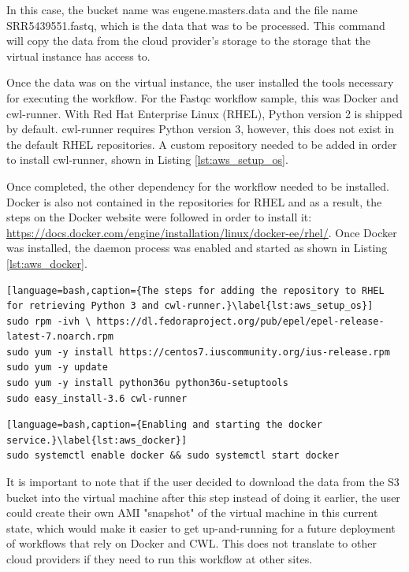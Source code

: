 In this case, the bucket name was eugene.masters.data and the file name SRR5439551.fastq, which is the data that was to be processed. This command will copy the data from the cloud provider's storage to the storage that the virtual instance has access to.

Once the data was on the virtual instance, the user installed the tools necessary for executing the workflow. For the Fastqc workflow sample, this was Docker and cwl-runner. With Red Hat Enterprise Linux (RHEL), Python version 2 is shipped by default. cwl-runner requires Python version 3, however, this does not exist in the default RHEL repositories. A custom repository needed to be added in order to install cwl-runner, shown in Listing \ref{lst:aws_setup_os}.

Once completed, the other dependency for the workflow needed to be installed. Docker is also not contained in the repositories for RHEL and as a result, the steps on the Docker website were followed in order to install it: \url{https://docs.docker.com/engine/installation/linux/docker-ee/rhel/}. Once Docker was installed, the daemon process was enabled and started as shown in Listing \ref{lst:aws_docker}.

\begin{minipage}{\linewidth}
\begin{lstlisting}[language=bash,caption={The steps for adding the repository to RHEL for retrieving Python 3 and cwl-runner.}\label{lst:aws_setup_os}]
sudo rpm -ivh \ https://dl.fedoraproject.org/pub/epel/epel-release-latest-7.noarch.rpm
sudo yum -y install https://centos7.iuscommunity.org/ius-release.rpm
sudo yum -y update
sudo yum -y install python36u python36u-setuptools
sudo easy_install-3.6 cwl-runner
\end{lstlisting}
\end{minipage}

\begin{lstlisting}[language=bash,caption={Enabling and starting the docker service.}\label{lst:aws_docker}]
sudo systemctl enable docker && sudo systemctl start docker
\end{lstlisting}

It is important to note that if the user decided to download the data from the S3 bucket into the virtual machine after this step instead of doing it earlier, the user could create their own AMI "snapshot" of the virtual machine in this current state, which would make it easier to get up-and-running for a future deployment of workflows that rely on Docker and CWL. This does not translate to other cloud providers if they need to run this workflow at other sites.

